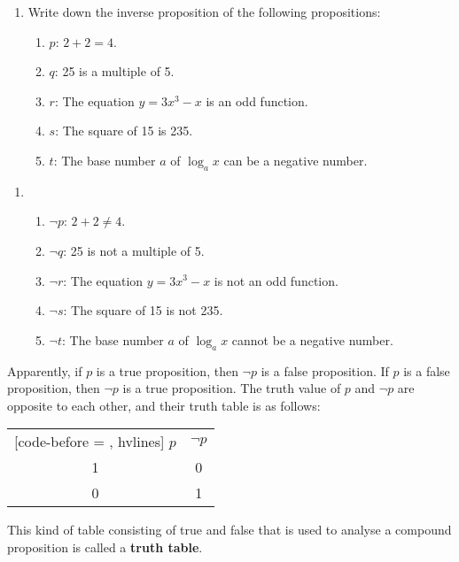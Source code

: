 \documentclass{report}
\begin{document}
\vspace{0.5cm}
\begin{enumerate}[label=\textbf{Example \arabic*}, leftmargin=*, start=3]
    \item Write down the inverse proposition of the following propositions:
          \begin{enumerate}[label=, leftmargin=*]
              \item $p$: $2 + 2 = 4$.
              \item $q$: 25 is a multiple of 5.
              \item $r$: The equation $y = 3x^3 - x$ is an odd function.
              \item $s$: The square of 15 is 235.
              \item $t$: The base number $a$ of $\log_a x$ can be a negative number.
          \end{enumerate}
\end{enumerate}
\begin{enumerate}[label=\textbf{Sol.}, leftmargin=*]
    \item \begin{enumerate}[label=, leftmargin=*]
              \item $\neg p$: $2 + 2 \neq 4$.
              \item $\neg q$: 25 is not a multiple of 5.
              \item $\neg r$: The equation $y = 3x^3 - x$ is not an odd function.
              \item $\neg s$: The square of 15 is not 235.
              \item $\neg t$: The base number $a$ of $\log_a x$ cannot be a negative number.
          \end{enumerate}
\end{enumerate}

Apparently, if $p$ is a true proposition, then $\neg p$ is a false proposition.
If $p$ is a false proposition, then $\neg p$ is a true proposition. The truth
value of $p$ and $\neg p$ are opposite to each other, and their truth table is
as follows:
\begin{center}
    \begin{NiceTabular}{|c|c|}[code-before = , hvlines]
        $p$ & $\neg p$ \\
        1   & 0        \\
        0   & 1        \\
    \end{NiceTabular}
\end{center}
This kind of table consisting of true and false that is used to analyse a compound proposition is called a \textbf{truth table}.
\end{document}
